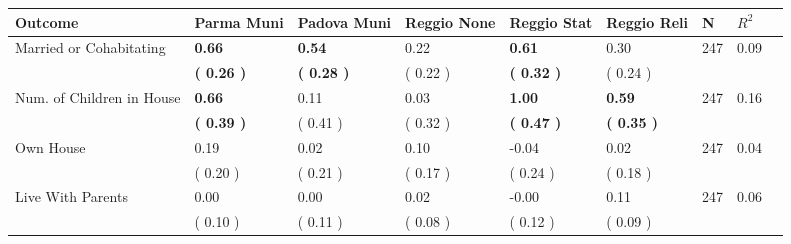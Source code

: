 \begin{tabular}{L{6.2cm} C{1.8cm} C{1.8cm} C{1.8cm} C{1.8cm} C{1.8cm} C{1.8cm} C{0.3cm} C{0.3cm}}
\toprule
 \textbf{Outcome} & \textbf{Parma Muni} & \textbf{Padova Muni} & \textbf{Reggio None} & \textbf{Reggio Stat} & \textbf{Reggio Reli} & \textbf{N} & \textbf{$ R^2$} \\
\midrule
Married or Cohabitating & \textbf{     0.66} & \textbf{     0.54} &      0.22 & \textbf{     0.61} &      0.30  & 247 &       0.09 \\ 
 & \textbf{(     0.26 )} & \textbf{(     0.28 )} & (     0.22 ) & \textbf{(     0.32 )} & (     0.24 )  & \\
Num. of Children in House & \textbf{     0.66} &      0.11 &      0.03 & \textbf{     1.00} & \textbf{     0.59}  & 247 &       0.16 \\ 
 & \textbf{(     0.39 )} & (     0.41 ) & (     0.32 ) & \textbf{(     0.47 )} & \textbf{(     0.35 )}  & \\
Own House &      0.19 &      0.02 &      0.10 &     -0.04 &      0.02  & 247 &       0.04 \\ 
 & (     0.20 ) & (     0.21 ) & (     0.17 ) & (     0.24 ) & (     0.18 )  & \\
Live With Parents &      0.00 &      0.00 &      0.02 &     -0.00 &      0.11  & 247 &       0.06 \\ 
 & (     0.10 ) & (     0.11 ) & (     0.08 ) & (     0.12 ) & (     0.09 )  & \\
\bottomrule
\end{tabular}
